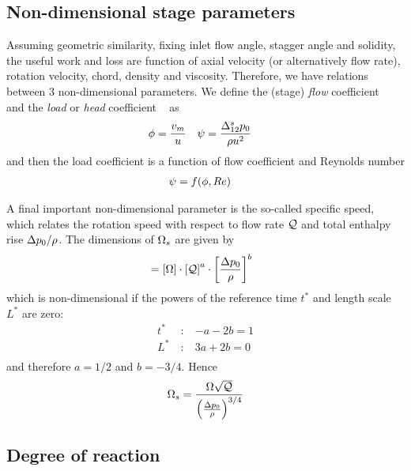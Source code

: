 \subsection{Non-dimensional stage parameters}

Assuming geometric similarity, fixing inlet flow angle, stagger angle
and solidity, the useful work and loss are function of axial velocity
(or alternatively flow rate), rotation velocity, chord, density and
viscosity. Therefore, we have relations between 3 non-dimensional
parameters. We define the (stage) \emph{flow} coefficient \flowCoeff~
and the \emph{load} or \emph{head} coefficient \headCoeff~ as
\begin{align*}
  \phi &= \frac{v_m}{u} &
  \psi &= \frac{\Delta_{12}^s p_{0}}{\rho u^2}
\end{align*}
and then the load coefficient is a function of flow coefficient and
Reynolds number
\begin{align*}
  \psi &= f(\phi,Re)
\end{align*}

A final important non-dimensional parameter is the so-called specific
speed, which relates the rotation speed with respect to flow rate
$\mathcal Q$ and total enthalpy rise $\Delta p_{0}/\rho$. The
dimensions of $\Omega_s$ are given by
\begin{align*}
  [\specificSpeed] 
  &= \left[\rot \right] \cdot \left[\vFlow\right]^a \cdot \left[\frac{\Delta \sPres{}}{\dens}\right]^b 
\end{align*}
which is non-dimensional if the powers of the reference time $t^\ast$ and
length scale $L^\ast$ are zero:
\begin{align*}
  t^\ast~&:~ &- a - 2b =  1 \\
  L^\ast~&:~ & 3a + 2b = 0 \\
\end{align*}
and therefore $a=1/2$ and $b=-3/4$. Hence 
\begin{align*}
  \Omega_s = \frac{\Omega \sqrt{\mathcal Q}}{\left(\frac{\Delta p_{0}}{\rho}\right)^{3/4}}
\end{align*}

\subsection{Degree of reaction}


